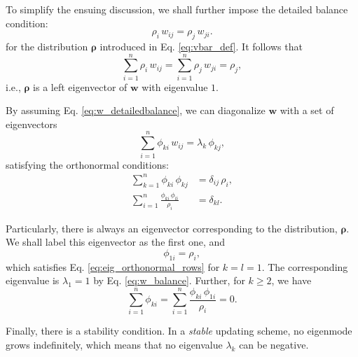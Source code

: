 \documentclass[reprint, floatfix]{revtex4-1}
\begin{document}
To simplify the ensuing discussion,
we shall further impose the
detailed balance condition:
%
\begin{equation}
  \rho_i \, w_{ij} = \rho_j \, w_{ji}.
  \label{eq:w_detailedbalance}
\end{equation}
%
for the distribution $\pmb \rho$
introduced in Eq. \eqref{eq:vbar_def}.
%
It follows that
\begin{equation}
  \sum_{i = 1}^n \rho_i \, w_{ij}
  =
  \sum_{i = 1}^n \rho_j \, w_{ji}
  =
  \rho_j,
  \label{eq:w_balance}
\end{equation}
%
i.e., $\mathbf \rho$ is a left eigenvector of
$\mathbf w$ with eigenvalue $1$.



By assuming Eq. \eqref{eq:w_detailedbalance},
we can diagonalize $\mathbf w$ with a set of
eigenvectors
%
\begin{equation}
  \sum_{i = 1}^n \phi_{ki} \, w_{ij}
  =
  \lambda_k \, \phi_{kj}
  ,
\label{eq:eig_w}
\end{equation}
%
satisfying the orthonormal conditions\cite{vankampen}:
%
\begin{align}
  \sum_{k = 1}^n
    \phi_{ki} \, \phi_{kj}
  &=
  \delta_{ij} \, \rho_i,
  \label{eq:eig_orthonormal_cols}
  \\
  \sum_{i = 1}^n
    \frac{ \phi_{ki} \, \phi_{li} }
         { \rho_i }
  &=
  \delta_{kl}
  .
\label{eq:eig_orthonormal_rows}
\end{align}

Particularly, there is always an eigenvector
corresponding to the distribution, $\pmb \rho$.
%
We shall label this eigenvector as the first one,
and
%
\begin{equation}
  \phi_{1i} = \rho_i,
\label{eq:eigenmode1}
\end{equation}
%
which satisfies Eq. \eqref{eq:eig_orthonormal_rows}
for $k = l = 1$.
%
The corresponding eigenvalue is $\lambda_1 = 1$
by Eq. \eqref{eq:w_balance}.
%
Further, for $k \ge 2$, we have
%
\begin{equation}
  \sum_{ i = 1 }^n \phi_{ki}
  =
  \sum_{ i = 1 }^n
    \frac{ \phi_{ki} \, \phi_{1i} }
         { \rho_i }
  =
  0
  .
\label{eq:ortho1}
\end{equation}

Finally, there is a stability condition.
%
In a \emph{stable} updating scheme,
no eigenmode grows indefinitely,
which means that no eigenvalue $\lambda_k$
can be negative.
\end{document}
